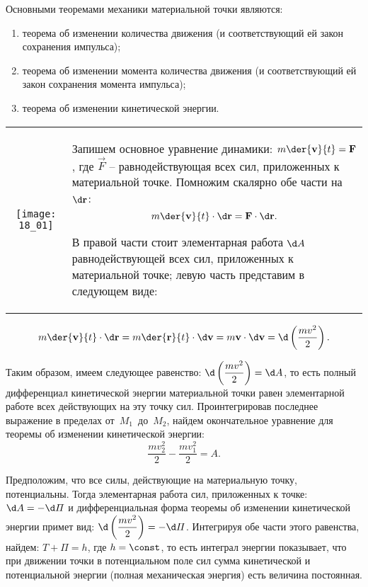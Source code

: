 
Основными теоремами механики материальной точки являются:
\begin{enumerate}
    \item теорема об изменении количества движения (и соответствующий ей закон
    сохранения импульса);
    \item теорема об изменении момента количества движения (и соответствующий ей
    закон сохранения момента импульса);
    \item теорема об изменении кинетической энергии.
\end{enumerate}


\begin{table}[h!]
    \begin{tabular}{C{.4}m{.5\textwidth}}
        \texttt{[image: 18\_01]} &
        Запишем основное уравнение динамики: \( \ds m\der{\vec{v}}{t} = \vec{F} \), где
        \( \vec{F} \) -- равнодействующая всех сил, приложенных к материальной точке.
        Помножим скалярно обе части на \( \d\vec{r} \):
        \[
            m\der{\vec{v}}{t}\cdot\d\vec{r} = \vec{F}\cdot\d\vec{r}.
        \]
        
        В правой части стоит элементарная работа \( \d A \) равнодействующей всех сил,
        приложенных к материальной точке; левую часть представим в следующем виде:
    \end{tabular}
\end{table}

\[
    m\der{\vec{v}}{t}\cdot\d\vec{r} = m\der{\vec{r}}{t}\cdot\d\vec{v} = m\vec{v}
    \cdot\d\vec{v} = \d\left(\frac{mv^2}{2}\right).
\]

Таким образом, имеем следующее равенство:
\( \ds \d\left(\frac{mv^2}{2}\right) = \d A\), то есть полный дифференциал
кинетической энергии материальной точки равен элементарной работе всех
действующих на эту точку сил. Проинтегрировав последнее выражение в пределах
от~\( M_1 \)~до~\( M_2 \), найдем окончательное уравнение для теоремы об изменении
кинетической энергии:
\[
    \frac{mv_2^2}{2} - \frac{mv_1^2}{2} = A.
\]


Предположим, что все силы, действующие на материальную точку, потенциальны.
Тогда элементарная работа сил, приложенных к точке: \( \d A = -\d\varPi \) и
дифференциальная форма теоремы об изменении кинетической энергии примет вид:
\( \ds \d\left(\frac{mv^2}{2}\right) = -\d\varPi \). Интегрируя обе части этого
равенства, найдем: \( T + \varPi = h \), где \( h = \const \), то есть интеграл
энергии показывает, что при движении точки в потенциальном поле сил сумма
кинетической и потенциальной энергии (полная механическая энергия) есть величина
постоянная.

\newpage
